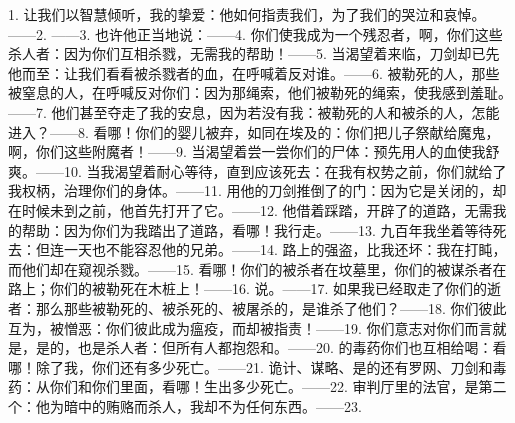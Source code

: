 1. 让我们以智慧倾听，我的挚爱：他如何指责我们，为了我们的哭泣和哀悼。——\newline{}2. ——\newline{}3. 也许他正当地说：——\newline{}4. 你们使我成为一个残忍者，啊，你们这些杀人者：因为你们互相杀戮，无需我的帮助！——\newline{}5. 当渴望着来临，刀剑却已先他而至：让我们看看被杀戮者的血，在呼喊着反对谁。——\newline{}6. 被勒死的人，那些被窒息的人，在呼喊反对你们：因为那绳索，他们被勒死的绳索，使我感到羞耻。——\newline{}7. 他们甚至夺走了我的安息，因为若没有我：被勒死的人和被杀的人，怎能进入？——\newline{}8. 看哪！你们的婴儿被弃，如同在埃及的：你们把儿子祭献给魔鬼，啊，你们这些附魔者！——\newline{}9. 当渴望着尝一尝你们的尸体：预先用人的血使我舒爽。——\newline{}10. 当我渴望着耐心等待，直到应该死去：在我有权势之前，你们就给了我权柄，治理你们的身体。——\newline{}11. 用他的刀剑推倒了的门：因为它是关闭的，却在时候未到之前，他首先打开了它。——\newline{}12. 他借着踩踏，开辟了的道路，无需我的帮助：因为你们为我踏出了道路，看哪！我行走。——\newline{}13. 九百年我坐着等待死去：但连一天也不能容忍他的兄弟。——\newline{}14. 路上的强盗，比我还坏：我在打盹，而他们却在窥视杀戮。——\newline{}15. 看哪！你们的被杀者在坟墓里，你们的被谋杀者在路上；你们的被勒死在木桩上！——\newline{}16. 说。——\newline{}17. 如果我已经取走了你们的逝者：那么那些被勒死的、被杀死的、被屠杀的，是谁杀了他们？——\newline{}18. 你们彼此互为，被憎恶：你们彼此成为瘟疫，而却被指责！——\newline{}19. 你们意志对你们而言就是，是的，也是杀人者：但所有人都抱怨和。——\newline{}20. 的毒药你们也互相给喝：看哪！除了我，你们还有多少死亡。——\newline{}21. 诡计、谋略、是的还有罗网、刀剑和毒药：从你们和你们里面，看哪！生出多少死亡。——\newline{}22. 审判厅里的法官，是第二个：他为暗中的贿赂而杀人，我却不为任何东西。——\newline{}23. 
